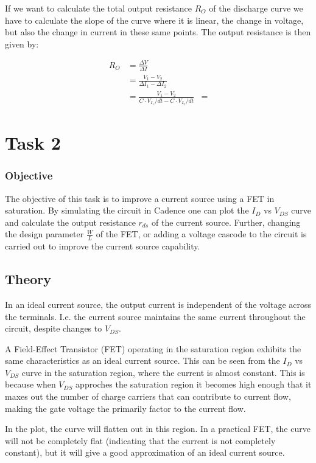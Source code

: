 \documentclass[onecolumn]{article}
\begin{document}
If we want to calculate the total output resistance $R_O$ of the discharge curve we have to calculate the slope of the curve where it is linear, the change in voltage, but also the change in current in these same points. The output resistance is then given by: 

\begin{align}
    R_O &= \frac{\Delta V}{\Delta I} \\
        &= \frac{V_1 - V_2}{\Delta I_1 - \Delta I_2}\\
        &= \frac{V_1 - V_2}{C \cdot V_{I_1}/dt - C \cdot V_{I_2}/dt}
        &=
\end{align}


\clearpage

\section{Task 2}

\subsubsection{Objective}
The objective of this task is to improve a current source using a FET in saturation. By simulating the circuit in Cadence one can plot the $I_D$ vs $V_{DS}$ curve and calculate the output resistance $r_{ds}$ of the current source. Further, changing the design parameter $\frac{W}{L}$ of the FET, or adding a voltage cascode to the circuit is carried out to improve the current source capability.

\subsection{Theory}

In an ideal current source, the output current is independent of the voltage across the terminals. I.e. the current source maintains the same current throughout the circuit, despite changes to $V_{DS}$.

A Field-Effect Transistor (FET) operating in the saturation region exhibits the same characteristics as an ideal current source. This can be seen from the $I_D$ vs $V_{DS}$ curve in the saturation region, where the current is almost constant. This is because when  $V_{DS}$ approches the saturation region it becomes high enough that it maxes out the number of charge carriers that can contribute to current flow, making the gate voltage the primarily factor to the current flow.

In the plot, the curve will flatten out in this region. In a practical FET, the curve will not be completely flat (indicating that the current is not completely constant), but it will give a good approximation of an ideal current source.
\end{document}

